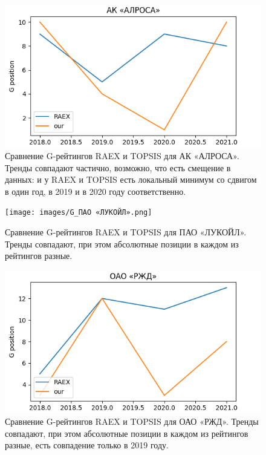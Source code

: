 \documentclass[a4paper, 14pt]{extarticle}
\begin{document}
\begin{figure}[H]
\centering
\includegraphics[width=0.8\linewidth]{images/G_АК «АЛРОСА».png}
\caption{Сравнение G-рейтингов RAEX и TOPSIS для АК «АЛРОСА». Тренды совпадают частично, возможно, что есть смещение в данных: и у RAEX и TOPSIS есть локальный минимум со сдвигом в один год, в 2019 и в 2020 году соответственно.}
\label{fig:g_alrosa}
\end{figure}

\begin{figure}[H]
\centering
\texttt{[image: images/G\_ПАО «ЛУКОЙЛ».png]}
\caption{Сравнение G-рейтингов RAEX и TOPSIS для ПАО «ЛУКОЙЛ». Тренды совпадают, при этом абсолютные позиции в каждом из рейтингов разные.}
\label{fig:g_lukoil}
\end{figure}

\begin{figure}[H]
\centering
\includegraphics[width=0.8\linewidth]{images/G_ОАО «РЖД».png}
\caption{Сравнение G-рейтингов RAEX и TOPSIS для ОАО «РЖД». Тренды совпадают, при этом абсолютные позиции в каждом из рейтингов разные, есть совпадение только в 2019 году.}
\label{fig:g_rgd}
\end{figure}
\end{document}
